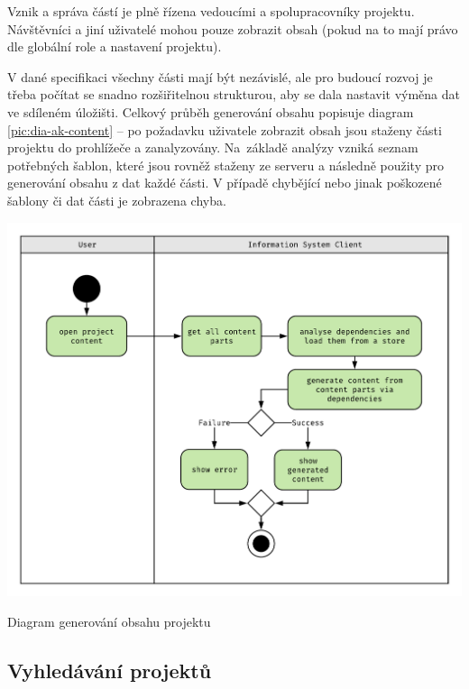 Vznik a správa částí je plně řízena vedoucími a spolupracovníky projektu. Návštěvníci a jiní uživatelé mohou pouze zobrazit obsah (pokud na to mají právo dle globální role a nastavení projektu).

V dané specifikaci všechny části mají být nezávislé, ale pro budoucí rozvoj je třeba počítat se snadno rozšiřitelnou strukturou, aby se dala nastavit výměna dat ve sdíleném úložišti. Celkový průběh generování obsahu popisuje diagram \ref{pic:dia-ak-content} -- po požadavku uživatele zobrazit obsah jsou staženy části projektu do prohlížeče a zanalyzovány. Na~základě analýzy vzniká seznam potřebných šablon, které jsou rovněž staženy ze serveru a následně použity pro generování obsahu z dat každé části. V případě chybějící nebo jinak poškozené šablony či dat části je zobrazena chyba.

\begin{fig:illustration}
   \includegraphics[width=1\textwidth]{images/dia-ak-content.pdf}
   \caption{Diagram generování obsahu projektu}\label{pic:dia-ak-content}
\end{fig:illustration}




\subsection{Vyhledávání projektů}

